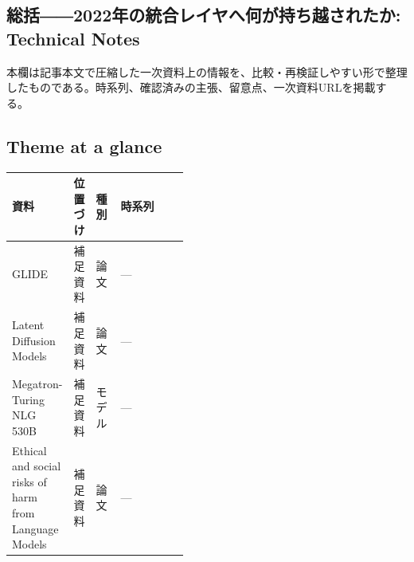 \subsection*{総括――2022年の統合レイヤへ何が持ち越されたか: Technical Notes}
本欄は記事本文で圧縮した一次資料上の情報を、比較・再検証しやすい形で整理したものである。時系列、確認済みの主張、留意点、一次資料URLを掲載する。
\smallskip
{}\par
\medskip
\subsection*{Theme at a glance}
\begin{center}
\footnotesize
\begin{tabularx}{\linewidth}{@{}p{0.20\linewidth}p{0.10\linewidth}p{0.14\linewidth}X@{}}
\toprule
資料 & 位置づけ & 種別 & 時系列 \\
\midrule
GLIDE & 補足資料 & 論文 & — \\
Latent Diffusion Models & 補足資料 & 論文 & — \\
Megatron-Turing NLG 530B & 補足資料 & モデル & — \\
Ethical and social risks of harm from Language Models & 補足資料 & 論文 & — \\
\bottomrule
\end{tabularx}
\end{center}
\normalsize

